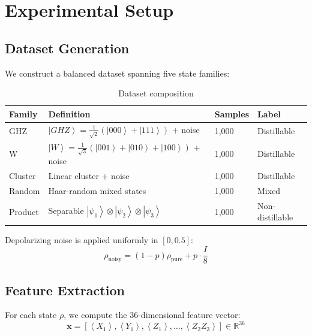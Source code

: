 \documentclass[11pt,a4paper]{article}
\newcommand{\ket}[1]{\left|#1\right\rangle}
\newcommand{\expect}[1]{\left\langle#1\right\rangle}
\newcommand{\R}{\mathbb{R}}
\begin{document}
\section{Experimental Setup}

\subsection{Dataset Generation}

We construct a balanced dataset spanning five state families:

\begin{table}[h]
\centering
\caption{Dataset composition}
\begin{tabular}{llll}
\toprule
\textbf{Family} & \textbf{Definition} & \textbf{Samples} & \textbf{Label} \\
\midrule
GHZ & $\ket{GHZ} = \frac{1}{\sqrt{2}}(\ket{000} + \ket{111})$ + noise & 1,000 & Distillable \\
W & $\ket{W} = \frac{1}{\sqrt{3}}(\ket{001} + \ket{010} + \ket{100})$ + noise & 1,000 & Distillable \\
Cluster & Linear cluster + noise & 1,000 & Distillable \\
Random & Haar-random mixed states & 1,000 & Mixed \\
Product & Separable $\ket{\psi_1}\otimes\ket{\psi_2}\otimes\ket{\psi_3}$ & 1,000 & Non-distillable \\
\bottomrule
\end{tabular}
\end{table}

Depolarizing noise is applied uniformly in $[0, 0.5]$:
\begin{equation}
\rho_{\text{noisy}} = (1-p)\rho_{\text{pure}} + p \cdot \frac{I}{8}
\end{equation}

\subsection{Feature Extraction}

For each state $\rho$, we compute the 36-dimensional feature vector:
\begin{equation}
\mathbf{x} = [\expect{X_1}, \expect{Y_1}, \expect{Z_1}, \ldots, \expect{Z_2 Z_3}] \in \R^{36}
\end{equation}
\end{document}
